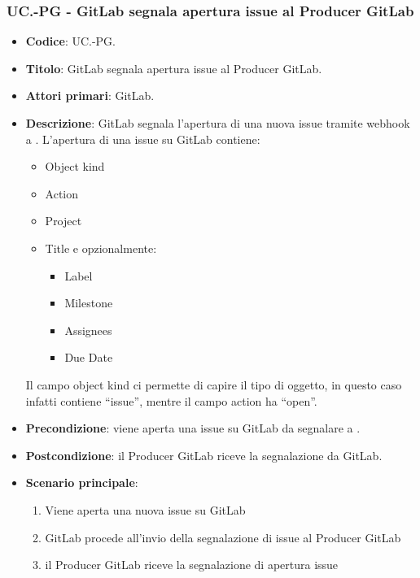 \subsubsection{UC\theuccount.\thesubuccount-PG - GitLab segnala apertura issue al Producer GitLab}
\begin{itemize}
    \item \textbf{Codice}: UC\theuccount.\thesubuccount-PG.
    \item \textbf{Titolo}: GitLab segnala apertura issue al Producer GitLab.
    \item \textbf{Attori primari}: GitLab.
    \item \textbf{Descrizione}: GitLab segnala l'apertura di una nuova issue tramite webhook a \progetto.
    L'apertura di una issue su GitLab contiene:
    \begin{itemize}
        \item Object kind
        \item Action
        \item Project
        \item Title e opzionalmente:
        \begin{itemize}
            \item Label
            \item Milestone
            \item Assignees
            \item Due Date
        \end{itemize}
    \end{itemize}
    Il campo object kind ci permette di capire il tipo di oggetto, in questo caso infatti contiene ``issue'', mentre il campo action ha ``open''.
    \item \textbf{Precondizione}: viene aperta una issue su GitLab da 
    segnalare a \progetto.
    \item \textbf{Postcondizione}: il Producer GitLab riceve la segnalazione da GitLab.
    \item \textbf{Scenario principale}: 
    \begin{enumerate}
        \item Viene aperta una nuova issue su GitLab
        \item GitLab procede all'invio della segnalazione di issue al Producer GitLab
        \item il Producer GitLab riceve la segnalazione di apertura issue
    \end{enumerate}
    
\end{itemize}

